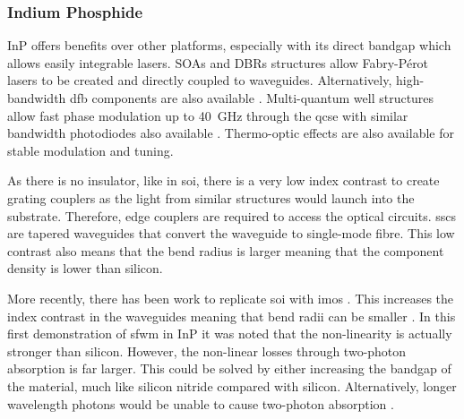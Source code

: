 
\subsubsection*{Indium Phosphide}

\Ac{InP} offers benefits over other platforms, especially with its direct bandgap which allows easily integrable lasers. \Acp{SOA} and \acp{DBR} structures allow Fabry-P\'{e}rot lasers to be created and directly coupled to waveguides. Alternatively, high-bandwidth \ac{dfb} components are also available \cite{smit2014, jeppix}. Multi-quantum well structures allow fast phase modulation up to \SI{40}{GHz} through the \ac{qcse} with similar bandwidth photodiodes also available \cite{smit2014}. Thermo-optic effects are also available for stable modulation and tuning.

As there is no insulator, like in \ac{soi}, there is a very low index contrast to create grating couplers as the light from similar structures would launch into the substrate. Therefore, edge couplers are required to access the optical circuits. \Acp{ssc} are tapered waveguides that convert the waveguide to single-mode fibre. This low contrast also means that the bend radius is larger meaning that the component density is lower than silicon.

More recently, there has been work to replicate \ac{soi} with \ac{imos} \cite{IMOS, van2011photonic}. This increases the index contrast in the waveguides meaning that bend radii can be smaller \cite{Kumar2019}. In this first demonstration of \ac{sfwm} in \ac{InP} it was noted that the non-linearity is actually stronger than silicon. However, the non-linear losses through two-photon absorption is far larger. This could be solved by either increasing the bandgap of the material, much like silicon nitride compared with silicon. Alternatively, longer wavelength photons would be unable to cause two-photon absorption \cite{rosenfeld2019mid}. 





